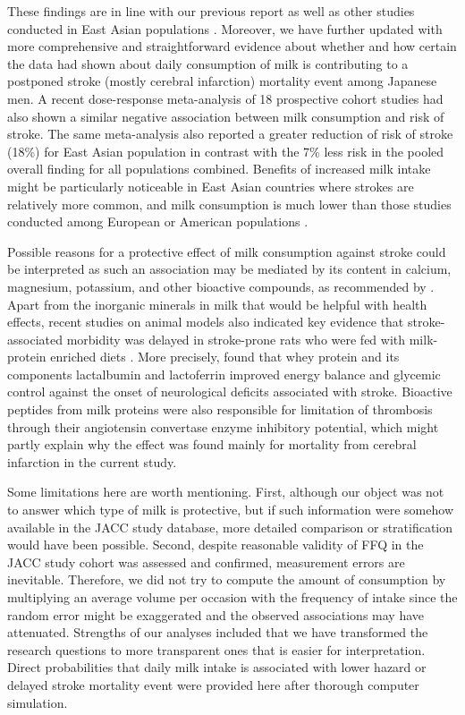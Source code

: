 \documentclass[nutrients,article,submitted,moreauthors,pdftex]{mdpi}
\begin{document}
These findings are in line with our previous report
\citep{wang_milk_2015} as well as other studies conducted in East Asian
populations
\citep{umesawa2008dietary, kondo2013consumption, ozawa2017dietary, sauvaget2003intake, Talaei_2016}.
Moreover, we have further updated with more comprehensive and
straightforward evidence about whether and how certain the data had
shown about daily consumption of milk is contributing to a postponed
stroke (mostly cerebral infarction) mortality event among Japanese men.
A recent dose-response meta-analysis of 18 prospective cohort studies
had also shown a similar negative association \citep{DeGoede2016}
between milk consumption and risk of stroke. The same meta-analysis also
reported a greater reduction of risk of stroke (18\%) for East Asian
population in contrast with the 7\% less risk in the pooled overall
finding for all populations combined. Benefits of increased milk intake
might be particularly noticeable in East Asian countries where strokes
are relatively more common, and milk consumption is much lower than
those studies conducted among European or American populations
\citep{dehghan2018association}.

Possible reasons for a protective effect of milk consumption against
stroke could be interpreted as such an association may be mediated by
its content in calcium, magnesium, potassium, and other bioactive
compounds, as recommended by \citet{Iacoviello2018}. Apart from the
inorganic minerals in milk that would be helpful with health effects,
recent studies on animal models also indicated key evidence that
stroke-associated morbidity was delayed in stroke-prone rats who were
fed with milk-protein enriched diets \citep{Chiba2012, singh2016diets}.
More precisely, \citet{Singh2020} found that whey protein and its
components lactalbumin and lactoferrin improved energy balance and
glycemic control against the onset of neurological deficits associated
with stroke. Bioactive peptides from milk proteins were also responsible
for limitation of thrombosis \citep{tokajuk2019whey} through their
angiotensin convertase enzyme inhibitory potential, which might partly
explain why the effect was found mainly for mortality from cerebral
infarction in the current study.

Some limitations here are worth mentioning. First, although our object
was not to answer which type of milk is protective, but if such
information were somehow available in the JACC study database, more
detailed comparison or stratification would have been possible. Second,
despite reasonable validity of FFQ in the JACC study cohort was assessed
and confirmed, measurement errors are inevitable. Therefore, we did not
try to compute the amount of consumption by multiplying an average
volume per occasion with the frequency of intake since the random error
might be exaggerated and the observed associations may have attenuated.
Strengths of our analyses included that we have transformed the research
questions to more transparent ones that is easier for interpretation.
Direct probabilities that daily milk intake is associated with lower
hazard or delayed stroke mortality event were provided here after
thorough computer simulation.
\end{document}
